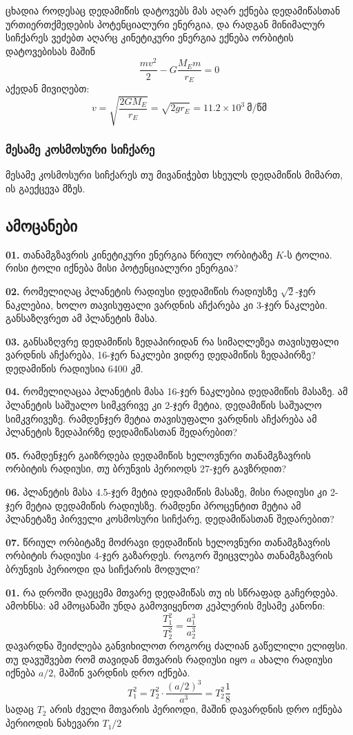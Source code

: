 \documentclass{book}
\begin{document}
ცხადია როდესაც დედამიწის დატოვებს მას აღარ ექნება დედამიწასთან ურთიერთქმედების პოტენციალური ენერგია, და რადგან მინიმალურ სიჩქარეს ვეძებთ აღარც კინეტიკური ენერგია ექნება ორბიტის დატოვებისას მაშინ
			\begin{equation}
				\frac{mv^2}{2} - G\frac{M_E m}{r_E} = 0
			\end{equation}
აქედან მივიღებთ:
			\begin{equation}
				v = \sqrt{\frac{2GM_E}{r_E}} = \sqrt{2 g r_E} = 11.2 \times 10^3 ~ \text{მ/წმ}
			\end{equation}

\subsubsection{მესამე კოსმოსური სიჩქარე}
მესამე კოსმოსური სიჩქარეს თუ მივანიჭებთ სხეულს დედამიწის მიმართ, ის გაექცევა მზეს.


\subsection{ამოცანები}
\qquad \textbf{01.} თანამგზავრის კინეტიკური ენერგია წრიულ ორბიტაზე $K$-ს ტოლია. რისი ტოლი იქნება მისი პოტენციალური ენერგია?

\textbf{02.} რომელიღაც პლანეტის რადიუსი დედამიწის რადიუსზე $\sqrt{2}$-ჯერ ნაკლებია, ხოლო თავისუფალი ვარდნის აჩქარება კი 3-ჯერ ნაკლები. განსაზღვრეთ ამ პლანეტის მასა.

\textbf{03.} განსაზღვრე დედამიწის ზედაპირიდან რა სიმაღლეზეა თავისუფალი ვარდნის აჩქარება, 16-ჯერ ნაკლები ვიდრე დედამიწის ზედაპირზე? დედამიწის რადიუსია 6400 კმ.

\textbf{04.} რომელიღაცაა პლანეტის მასა 16-ჯერ ნაკლებია დედამიწის მასაზე. ამ პლანეტის საშუალო სიმკვრივე კი 2-ჯერ მეტია, დედამიწის საშუალო სიმკვრივეზე. რამდენჯერ მეტია თავისუფალი ვარდნის აჩქარება ამ პლანეტის ზედაპირზე დედამიწასთან შედარებით?

\textbf{05.} რამდენჯერ გაიზრდება დედამიწის ხელოვნური თანამგზავრის ორბიტის რადიუსი, თუ ბრუნვის პერიოდს 27-ჯერ გავზრდით?

\textbf{06.} პლანეტის მასა 4.5-ჯერ მეტია დედამიწის მასაზე, მისი რადიუსი კი 2-ჯერ მეტია დედამიწის რადიუსზე. რამდენი პროცენტით მეტია ამ პლანეტაზე პირველი კოსმოსური სიჩქარე, დედამიწასთან შედარებით?

\textbf{07.} წრიულ ორბიტაზე მოძრავი დედამიწის ხელოვნური თანამგზავრის ორბიტის რადიუსი 4-ჯერ გაზარდეს. როგორ შეიცვლება თანამგზავრის ბრუნვის პერიოდი და სიჩქარის მოდული? 


\textbf{01.} რა დროში დაეცემა მთვარე დედამიწას თუ ის სწრაფად გაჩერდება.\\
ამოხნსა: ამ ამოცანაში უნდა გამოვიყენოთ კეპლერის მესამე კანონი:
	\begin{equation}
		\frac{T_1^2}{T_2^2} = \frac{a_1^3}{a_2^3}
	\end{equation}
დავარდნა შეიძლება განვიხილოთ როგორც ძალიან გაწელილი ელიფსი. თუ დავუშვებთ რომ თავიდან მთვარის რადიუსი იყო $a$ ახალი რადიუსი იქნება $a/2$, მაშინ ვარდნის დრო იქნება.
	\begin{equation}
		T_1^2 = T_2^2\cdot\frac{(a/2)^3}{a^3} = T_2^2 \frac{1}{8}
	\end{equation}
სადაც $T_2$ არის ძველი მთვარის პერიოდი, მაშინ დავარდნის დრო იქნება პერიოდის ნახევარი $T_1/2$
\end{document}
